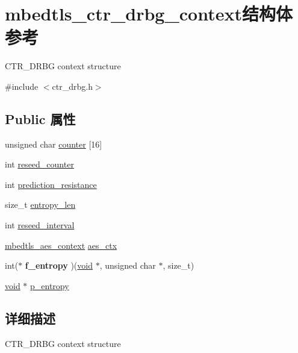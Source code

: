 \hypertarget{structmbedtls__ctr__drbg__context}{}\section{mbedtls\+\_\+ctr\+\_\+drbg\+\_\+context结构体 参考}
\label{structmbedtls__ctr__drbg__context}


C\+T\+R\+\_\+\+D\+R\+BG context structure  




{\ttfamily \#include $<$ctr\+\_\+drbg.\+h$>$}

\subsection*{Public 属性}
\begin{DoxyCompactItemize}
\item 
unsigned char \hyperlink{structmbedtls__ctr__drbg__context_a45ccb95b2b7828711c158fc4a06d41fc}{counter} \mbox{[}16\mbox{]}
\item 
int \hyperlink{structmbedtls__ctr__drbg__context_abdbeba1194553f4f1a3534712dc0c9f9}{reseed\+\_\+counter}
\item 
int \hyperlink{structmbedtls__ctr__drbg__context_ae521e373913548f732e0cdfe3e82d2ac}{prediction\+\_\+resistance}
\item 
size\+\_\+t \hyperlink{structmbedtls__ctr__drbg__context_aa874779eab1f355824ff692b33755476}{entropy\+\_\+len}
\item 
int \hyperlink{structmbedtls__ctr__drbg__context_a7b048c97f8dc916d89a0c7cd9d7f8522}{reseed\+\_\+interval}
\item 
\hyperlink{structmbedtls__aes__context}{mbedtls\+\_\+aes\+\_\+context} \hyperlink{structmbedtls__ctr__drbg__context_ab9513701b8389770eb294cbc4267ff92}{aes\+\_\+ctx}
\item 
\mbox{\label{structmbedtls__ctr__drbg__context_a996a460946cf035a5de799c6fc905f62}} 
int($\ast$ {\bfseries f\+\_\+entropy} )(\hyperlink{interfacevoid}{void} $\ast$, unsigned char $\ast$, size\+\_\+t)
\item 
\hyperlink{interfacevoid}{void} $\ast$ \hyperlink{structmbedtls__ctr__drbg__context_a85ca46b24fc75d3d1c091835c8c2e0b4}{p\+\_\+entropy}
\end{DoxyCompactItemize}


\subsection{详细描述}
C\+T\+R\+\_\+\+D\+R\+BG context structure 

